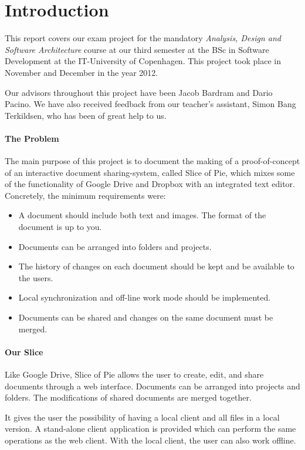 \section{Introduction}
This report covers our exam project for the mandatory \emph{Analysis, Design and Software Architecture}
course at our third semester at the BSc in Software Development at the IT-University of Copenhagen.
This project took place in November and December in the year 2012. 

Our advisors throughout this project have been Jacob Bardram and Dario Pacino. We have also received feedback from
our teacher's assistant, Simon Bang Terkildsen, who has been of great help to us.

\paragraph{The Problem}
The main purpose of this project is to document the making of a proof-of-concept of an interactive document
sharing-system, called Slice of Pie, which mixes some of the functionality of Google Drive and Dropbox with
an integrated text editor.
Concretely, the minimum requirements were:
\begin{itemize}
\item A document should include both text and images. The format of the document is up to you.
\item Documents can be arranged into folders and projects.
\item The history of changes on each document should be kept and be available to the users.
\item Local synchronization and off-line work mode should be implemented.
\item Documents can be shared and changes on the same document must be merged.
\end{itemize}
\paragraph{Our Slice}
Like Google Drive, Slice of Pie allows the user to create, edit, and share documents through a web interface.
Documents can be arranged into projects and folders. The modifications of shared documents are merged together.

It gives the user the possibility of having a local client and all files in a local version. A stand-alone client
application is provided which can perform the same operations as the web client. With the local client, the user
can also work offline.

